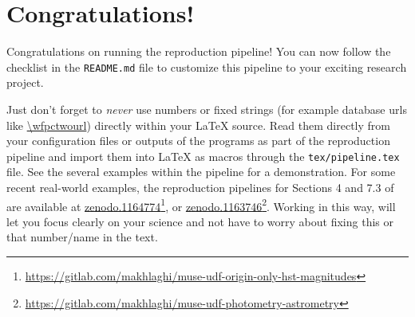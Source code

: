 \documentclass[10pt, twocolumn]{article}
\begin{document}

\thispagestyle{firststyle}





\section{Congratulations!}
Congratulations on running the reproduction pipeline! You can now follow
the checklist in the \texttt{README.md} file to customize this pipeline to
your exciting research project.

Just don't forget to \emph{never} use numbers or fixed strings (for example
database urls like \url{\wfpctwourl}) directly within your \LaTeX{}
source. Read them directly from your configuration files or outputs of the
programs as part of the reproduction pipeline and import them into \LaTeX{}
as macros through the \texttt{tex/pipeline.tex} file. See the several
examples within the pipeline for a demonstration. For some recent
real-world examples, the reproduction pipelines for Sections 4 and 7.3 of
\citet{bacon17} are available at
\href{https://doi.org/10.5281/zenodo.1164774}{zenodo.1164774}\footnote{\url{https://gitlab.com/makhlaghi/muse-udf-origin-only-hst-magnitudes}},
or
\href{https://doi.org/10.5281/zenodo.1163746}{zenodo.1163746}\footnote{\url{https://gitlab.com/makhlaghi/muse-udf-photometry-astrometry}}. Working
in this way, will let you focus clearly on your science and not have to
worry about fixing this or that number/name in the text.
\end{document}
